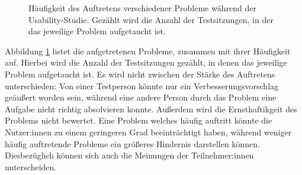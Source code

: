 \begin{figure}[!ht]
  \caption{Häufigkeit des Auftretens verschiedener Probleme während der Usability-Studie. Gezählt wird die Anzahl der Testsitzungen, in der das jeweilige Problem aufgetaucht ist.}
  \label{figure:problems}
\end{figure}

Abbildung \ref{figure:problems} listet die aufgetretenen Probleme, zusammen mit ihrer Häufigkeit auf. Hierbei wird die Anzahl der Testsitzungen gezählt, in denen das jeweilige Problem aufgetaucht ist. Es wird nicht zwischen der Stärke des Auftretens unterschieden: Von einer Testperson könnte nur ein Verbesserungsvorschlag geäußert worden sein, während eine andere Person durch das Problem eine Aufgabe nicht richtig absolvieren konnte. Außerdem wird die Ernsthaftikgeit des Problems nicht bewertet. Eine Problem welches häufig auftritt könnte die Nutzer:innen zu einem geringeren Grad beeinträchtigt haben, während weniger häufig auftretende Probleme ein größeres Hindernis darstellen können. Diesbezüglich können sich auch die Meinungen der Teilnehmer:innen unterscheiden.

